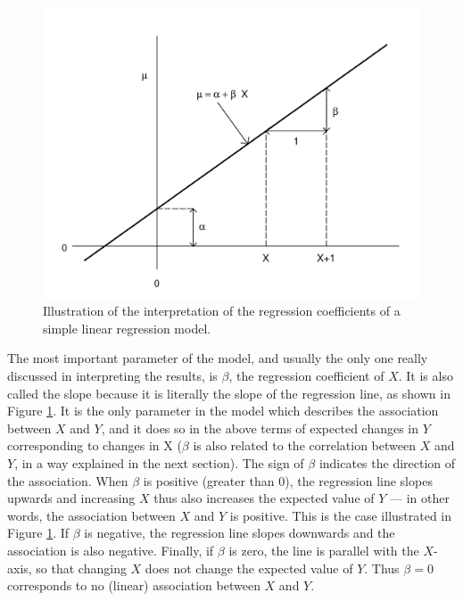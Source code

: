 \begin{figure}
\caption{Illustration of the interpretation of the regression
coefficients of a simple linear regression model.}
\label{f_linmod_params}
\vspace*{-4ex}
\begin{center}
\includegraphics[width=12.5cm]{lmparams}
\end{center}
\vspace*{-2ex}
\end{figure}

The most important parameter of the model, and usually the only one
really discussed in interpreting the results, is $\beta$, the regression
coefficient of $X$. It is also called the slope because it is literally
the slope of the regression line, as shown in Figure
\ref{f_linmod_params}. It is the only parameter in the model which
describes the association between $X$ and $Y$, and it does so in the
above terms of expected changes in $Y$ corresponding to changes in X
($\beta$ is also related to the correlation between $X$ and $Y$, in a
way explained in the next section). The sign of $\beta$ indicates the
direction of the association. When $\beta$ is positive (greater than 0),
the regression line slopes upwards and increasing $X$ thus also
increases the expected value of $Y$ --- in other words, the association
between $X$ and $Y$ is positive. This is the case illustrated in Figure
\ref{f_linmod_params}. If $\beta$ is negative, the regression line
slopes downwards and the association is also negative. Finally, if
$\beta$ is zero, the line is parallel with the $X$-axis, so that
changing $X$ does not change the expected value of $Y$. Thus
$\beta=0$ corresponds to no (linear) association between $X$ and $Y$.

